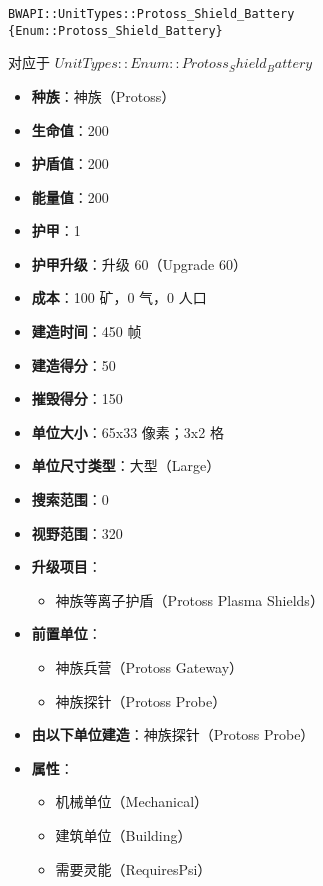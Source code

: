 \begin{tcolorbox}[colback=white, colframe=black!60!white, title=Protoss\_Shield\_Battery(), arc=0mm]
    \begin{verbatim}
BWAPI::UnitTypes::Protoss_Shield_Battery {Enum::Protoss_Shield_Battery}
    \end{verbatim}
    对应于  $ UnitTypes::Enum::Protoss_Shield_Battery $ 
    \begin{itemize}
        \item \textbf{种族}：神族（Protoss）
        \item \textbf{生命值}：200
        \item \textbf{护盾值}：200
        \item \textbf{能量值}：200
        \item \textbf{护甲}：1
        \item \textbf{护甲升级}：升级 60（Upgrade 60）
        \item \textbf{成本}：100 矿，0 气，0 人口
        \item \textbf{建造时间}：450 帧
        \item \textbf{建造得分}：50
        \item \textbf{摧毁得分}：150
        \item \textbf{单位大小}：65x33 像素；3x2 格
        \item \textbf{单位尺寸类型}：大型（Large）
        \item \textbf{搜索范围}：0
        \item \textbf{视野范围}：320
        \item \textbf{升级项目}：
            \begin{itemize}
                \item 神族等离子护盾（Protoss Plasma Shields）
            \end{itemize}
        \item \textbf{前置单位}：
            \begin{itemize}
                \item 神族兵营（Protoss Gateway）
                \item 神族探针（Protoss Probe）
            \end{itemize}
        \item \textbf{由以下单位建造}：神族探针（Protoss Probe）
        \item \textbf{属性}：
            \begin{itemize}
                \item 机械单位（Mechanical）
                \item 建筑单位（Building）
                \item 需要灵能（RequiresPsi）
            \end{itemize}
    \end{itemize}
\end{tcolorbox}

